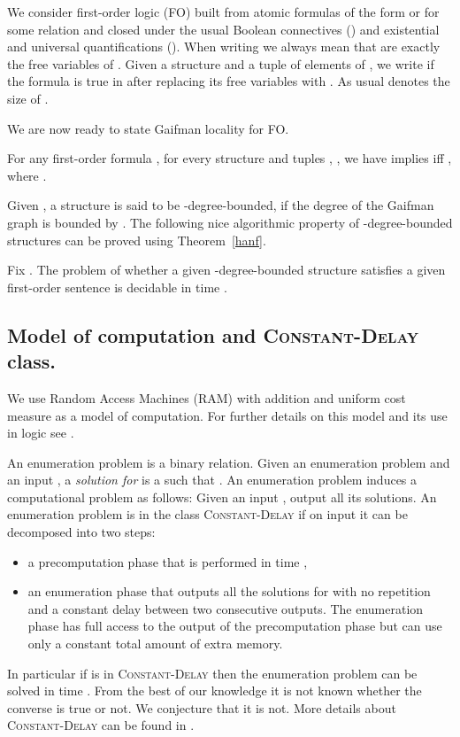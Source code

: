 \documentclass{LMCS}
\newcommand{\CDlin}{{\textsc{Constant-}\textsc{Delay}}\xspace}
\newcommand\FO{\textup{FO}\xspace}
\begin{document}
We consider first-order logic (\FO) built from atomic formulas of the form
 or  for some relation  and closed
under the usual Boolean connectives () and existential and
universal quantifications ().  When writing  we
always mean that  are exactly the free variables of . Given a
structure  and a tuple  of elements of , we write  if the formula  is true in  after
replacing its free variables with . As usual  denotes the size
of .

We are now ready to state Gaifman locality for \FO.

\begin{thm}\label{hanf}
  For any first-order formula , for every structure  and
  tuples , , we have  implies
   iff , where .
\end{thm}

Given , a structure is said to be -degree-bounded, if
the degree of the Gaifman graph is bounded by . The following nice
algorithmic property of -degree-bounded structures can be proved using
Theorem~\ref{hanf}.

\begin{thm}\label{Seese}
  Fix . The problem of whether a given -degree-bounded
  structure  satisfies a given first-order sentence  is decidable in
  time .
\end{thm}

\subsection{Model of computation and \CDlin class.}

We use Random Access Machines (RAM) with addition and uniform cost measure as a
model of computation. For further details on this model and its use in logic
see \cite{DurandGrandjean07}.

An enumeration problem is a binary relation. Given an enumeration problem 
and an input , a \emph{solution for } is a  such that .
An enumeration problem  induces a computational problem as follows: Given an
input , output all its solutions. An enumeration problem is in the class
\CDlin if on input  it can be decomposed into two steps:
\begin{itemize}
	\item a precomputation phase that is performed in time ,
	\item an enumeration phase that outputs all the solutions for  with
          no repetition and a constant delay between two consecutive
          outputs. The enumeration phase has full access to the output of the
          precomputation phase but can use only a constant total amount of extra memory.
\end{itemize}
In particular if  is in \CDlin then the enumeration problem  can be
solved in time .  From the best of our knowledge it
is not known whether the converse is true or not. We conjecture that it is not.
More details about \CDlin can be found in \cite{DurandGrandjean07}.
\end{document}
